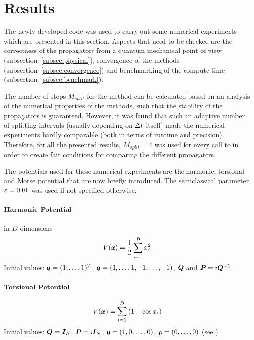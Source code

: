 \section{Results}
\label{sec:results}
%
The newly developed code was used to carry out some numerical experiments which are presented in this section.
Aspects that need to be checked are the correctness of the propagators from a quantum mechanical point of view (subsection~\ref{subsec:physical}), convergence of the methods (subsection~\ref{subsec:convergence}) and benchmarking of the compute time (subsection~\ref{subsec:benchmark}).
\par\medskip
%
The number of steps $M_{split}$ for the  method can be calculated based on an analysis of the numerical properties of the methods, such that the stability of the propagators is guaranteed.
However, it was found that such an adaptive number of splitting intervals (usually depending on $\Delta t$ itself) made the numerical experiments hardly comparable (both in terms of runtime and precision).
Therefore, for all the presented results, $M_{split}=4$ was used for every call to  in order to create fair conditions for comparing the different propagators.
\par\medskip
%
The potentials used for these numerical experiments are the harmonic, torsional and Morse potential that are now briefly introduced.
The semiclassical parameter $\varepsilon = 0.01$ was used if not specified otherwise.


\paragraph{Harmonic Potential} in $D$ dimensions
\begin{align}
	\label{math:harmonic}
	V(\bm{x}) = \frac{1}{2} \sum_{i=1}^D x_i^2
\end{align}
%
Initial values: $\bm{q} = (1,\dots,1)^T$, $\bm{q} = (1,\dots,1,-1,\dots,-1)$, $\bm{Q}$ and $\bm{P} = \imath \bm{Q}^{-1}$. \\
\par\medskip


\paragraph{Torsional Potential}
%
\begin{align}
	\label{math:torsional}
	V(\bm{x}) = \sum_{i=1}^D \left( 1 - \cos x_i \right)
\end{align}
%
Initial values: $\bm{Q} = \bm{I}_N$, $\bm{P} = \imath \bm{I}_N$, $\bm{q} = (1,0,\dots,0)$, $\bm{p} = (0,\dots,0)$ (see \cite{FGL_semiclassical_dynamics}).

